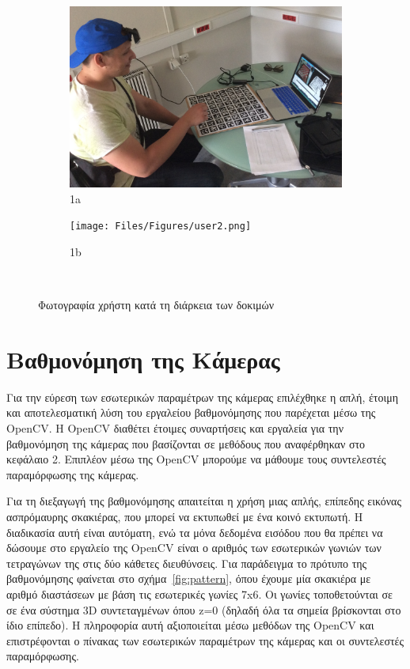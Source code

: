 \begin{figure}[H]
\begin{subfigure}{.5\textwidth}
  \centering
  \includegraphics[width=.8\linewidth]{Files/Figures/user1.png}
  \caption{1a}
  \label{fig:sfig1}
\end{subfigure}%
\begin{subfigure}{.5\textwidth}
  \centering
  \texttt{[image: Files/Figures/user2.png]}
  \caption{1b}
  \label{fig:sfig2}
\end{subfigure}\\
\caption{Φωτογραφία χρήστη κατά τη διάρκεια των δοκιμών}
\label{fig:test}
\end{figure}



\section{Βαθμονόμηση της Κάμερας}


Για την εύρεση των εσωτερικών παραμέτρων της κάμερας επιλέχθηκε η απλή, έτοιμη και αποτελεσματική λύση του εργαλείου βαθμονόμησης που παρέχεται μέσω της OpenCV. Η OpenCV διαθέτει έτοιμες συναρτήσεις και εργαλεία για την βαθμονόμηση της κάμερας που βασίζονται σε μεθόδους που αναφέρθηκαν στο κεφάλαιο 2. Επιπλέον μέσω της OpenCV μπορούμε να μάθουμε τους συντελεστές παραμόρφωσης της κάμερας. 


Για τη διεξαγωγή της βαθμονόμησης απαιτείται η χρήση μιας απλής, επίπεδης εικόνας ασπρόμαυρης σκακιέρας, που μπορεί να εκτυπωθεί με ένα κοινό εκτυπωτή. Η διαδικασία αυτή είναι αυτόματη, ενώ τα μόνα δεδομένα εισόδου που θα πρέπει να δώσουμε στο εργαλείο της OpenCV είναι ο αριθμός των εσωτερικών γωνιών των τετραγώνων της στις δύο κάθετες διευθύνσεις. Για παράδειγμα το πρότυπο της βαθμονόμησης φαίνεται στο σχήμα~\ref{fig:pattern}, όπου έχουμε μία σκακιέρα με αριθμό διαστάσεων με βάση τις εσωτερικές γωνίες 7x6.
Οι γωνίες τοποθετούνται σε σε ένα σύστημα 3D συντεταγμένων όπου z=0 (δηλαδή όλα τα σημεία βρίσκονται στο ίδιο επίπεδο). Η πληροφορία αυτή αξιοποιείται μέσω μεθόδων της OpenCV και επιστρέφονται ο πίνακας των εσωτερικών παραμέτρων της κάμερας και οι συντελεστές παραμόρφωσης. 



